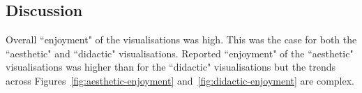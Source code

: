 \documentclass{sig-alternate}
\begin{document}





\subsection{Discussion}

Overall ``enjoyment" of the visualisations was high. This was the case for both the ``aesthetic" and ``didactic" visualisations.
Reported ``enjoyment" of the ``aesthetic" visualisations was higher than for the ``didactic" visualisations but the trends across Figures~\ref{fig:aesthetic-enjoyment} and~\ref{fig:didactic-enjoyment} are complex. 

\end{document}
